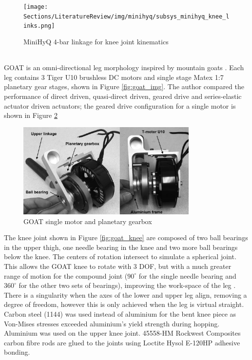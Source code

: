 \begin{figure}[H]
    \centering
    \texttt{[image: Sections/LiteratureReview/img/minihyq/subsys\_minihyq\_knee\_links.png]}
    \caption{MiniHyQ 4-bar linkage for knee joint kinematics \cite{khan_minihyq_2015}}
    \label{fig:minihyq_knee_links}
\end{figure}

 \mbox{}\\

GOAT is an omni-directional leg morphology inspired by mountain goats \cite{kalouche_design_2016}.
Each leg contains 3  Tiger U10 brushless DC motors and single stage Matex 1:7 planetary gear stages, shown in Figure \ref{fig:goat_img}.
The author compared the performance of direct driven, quasi-direct driven, geared drive and series-elastic actuator driven actuators; the geared drive configuration for a single motor is shown in Figure \ref{fig:goat_motors}

\begin{figure}[H]
    \centering
    \includegraphics[width=0.8\textwidth]{Sections/LiteratureReview/img/goat/subsys_goat_motor.png}
    \caption{GOAT single motor and planetary gearbox \cite{kalouche_design_2016}}
    \label{fig:goat_motors}
\end{figure}

The knee joint shown in Figure \ref{fig:goat_knee} are composed of two ball bearings in the upper thigh, one needle bearing in the knee and two more ball bearings below the knee. The centers of rotation intersect to simulate a spherical joint.
This allows the GOAT knee to rotate with 3 DOF, but with a much greater range of motion for the compound joint ($90^{\circ}$ for the single needle bearing and $360^{\circ}$ for the other two sets of bearings), improving the work-space of the leg \cite{kalouche_design_2016}.
There is a singularity when the axes of the lower and upper leg align, removing a degree of freedom, however this is only achieved when the leg is virtual straight.
Carbon steel (1144) was used instead of aluminium for the bent knee piece as Von-Mises stresses exceeded aluminium's yield strength during hopping. Aluminium was used on the upper knee joint.
45558-HM Rockwest Composites carbon fibre rods are glued to the joints using Loctite Hysol E-120HP adhesive bonding.

